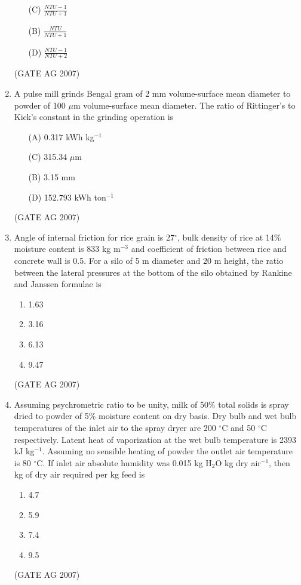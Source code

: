 \documentclass[journal,12pt,onecolumn]{IEEEtran}
\theoremstyle{remark}
\begin{document}
\begin{enumerate}[label=Q\arabic*:]
\begin{multicols}{2}
\begin{enumerate}
    \item[(C)] $\frac{NTU - 1}{NTU+1}$
    \item[(B)] $\frac{NTU}{NTU+1}$
    
    \item[(D)] $\frac{NTU - 1}{NTU+2}$
\end{enumerate}
\end{multicols}
\hfill(GATE AG 2007)

\item  A pulse mill grinds Bengal gram of 2 mm volume-surface mean diameter to powder of 100 $\mu$m volume-surface mean diameter. The ratio of Rittinger's to Kick's constant in the grinding operation is
\begin{multicols}{2}
\begin{enumerate}
    \item[(A)] 0.317 kWh kg$^{-1}$
    \item[(C)] 315.34 $\mu$m
    \item[(B)] 3.15 mm
    \item[(D)] 152.793 kWh ton$^{-1}$
\end{enumerate}
\end{multicols}
\hfill(GATE AG 2007)

\item Angle of internal friction for rice grain is 27$^{\circ}$, bulk density of rice at 14\% moisture content is 833 kg m$^{-3}$ and coefficient of friction between rice and concrete wall is 0.5. For a silo of 5 m diameter and 20 m height, the ratio between the lateral pressures at the bottom of the silo obtained by Rankine and Janssen formulae is
\begin{multicols}{4}
\begin{enumerate}
    \item 1.63
    \item 3.16
    \item 6.13
    \item 9.47
\end{enumerate}
\end{multicols}
\hfill(GATE AG 2007)

\item Assuming psychrometric ratio to be unity, milk of 50\% total solids is spray dried to powder of 5\% moisture content on dry basis. Dry bulb and wet bulb temperatures of the inlet air to the spray dryer are 200 $^{\circ}$C and 50 $^{\circ}$C respectively. Latent heat of vaporization at the wet bulb temperature is 2393 kJ kg$^{-1}$. Assuming no sensible heating of powder the outlet air temperature is 80 $^{\circ}$C. If inlet air absolute humidity was 0.015 kg H$_2$O kg dry air$^{-1}$, then kg of dry air required per kg feed is
\begin{multicols}{4}
\begin{enumerate}
    \item 4.7
    \item 5.9
    \item 7.4
    \item 9.5
\end{enumerate}
\end{multicols}
\hfill(GATE AG 2007)


\end{enumerate}
\end{document}
